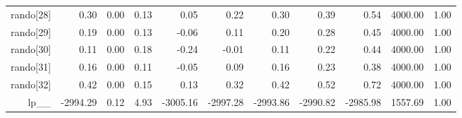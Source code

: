 \begin{table}[ht]
\begin{tabular}{rrrrrrrrrrr}
  rando[28] & 0.30 & 0.00 & 0.13 & 0.05 & 0.22 & 0.30 & 0.39 & 0.54 & 4000.00 & 1.00 \\ 
  rando[29] & 0.19 & 0.00 & 0.13 & -0.06 & 0.11 & 0.20 & 0.28 & 0.45 & 4000.00 & 1.00 \\ 
  rando[30] & 0.11 & 0.00 & 0.18 & -0.24 & -0.01 & 0.11 & 0.22 & 0.44 & 4000.00 & 1.00 \\ 
  rando[31] & 0.16 & 0.00 & 0.11 & -0.05 & 0.09 & 0.16 & 0.23 & 0.38 & 4000.00 & 1.00 \\ 
  rando[32] & 0.42 & 0.00 & 0.15 & 0.13 & 0.32 & 0.42 & 0.52 & 0.72 & 4000.00 & 1.00 \\ 
  lp\_\_ & -2994.29 & 0.12 & 4.93 & -3005.16 & -2997.28 & -2993.86 & -2990.82 & -2985.98 & 1557.69 & 1.00 \\ 
   \hline
\end{tabular}
\label{weifit_tab}
\end{table}
